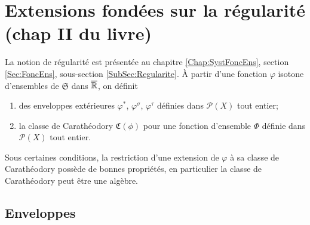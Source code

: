 \chapter{Extensions fondées sur la régularité \small{(chap II du livre)}}\label{Chap:ExtenRegul}
La notion de régularité est présentée au chapitre \ref{Chap:SystFoncEns}, section \ref{Sec:FoncEns}, sous-section \ref{SubSec:Regularite}. À partir d'une fonction $\varphi$ isotone d'ensembles de $\mathfrak{S}$ dans $\overline{\mathbb{R}}$, on définit
\begin{enumerate}
 \item des enveloppes extérieures $\varphi^*$, $\varphi^\sigma$, $\varphi^\tau$ définies dans $\mathcal{P}(X)$ tout entier;
 \item la classe de Carathéodory $\mathfrak{C}(\phi)$ pour une fonction d'ensemble $\Phi$ définie dans $\mathcal{P}(X)$ tout entier.
\end{enumerate}
Sous certaines conditions, la restriction d'une extension de $\varphi$ à sa classe de Carathéodory possède de bonnes propriétés, en particulier la classe de Carathéodory peut être une algèbre.

\section{Enveloppes}\label{Sec:Enveloppes}
